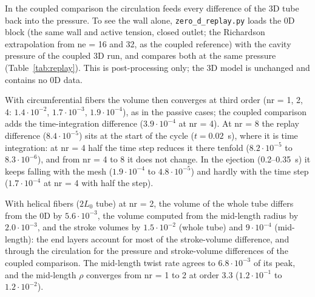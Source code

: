 In the coupled comparison the circulation feeds every difference of the 3D tube back into
the pressure. To see the wall alone, \texttt{zero\_d\_replay.py} loads the 0D block (the
same wall and active tension, closed outlet; the Richardson extrapolation from ne = 16
and 32, as the coupled reference) with the cavity pressure of the
coupled 3D run, and compares both at the same pressure (Table~\ref{tab:replay}). This is
post-processing only; the 3D model is unchanged and contains no 0D data.

With circumferential fibers the volume then converges at third order (nr = 1, 2, 4:
$1.4\cdot10^{-2}$, $1.7\cdot10^{-3}$, $1.9\cdot10^{-4}$), as in the passive cases; the
coupled comparison adds the time-integration difference ($3.9\cdot10^{-4}$ at nr = 4). At
nr = 8 the replay difference ($8.4\cdot10^{-5}$) sits at the start of the cycle
($t = 0.02$~s), where it is time integration: at nr = 4 half the time step reduces it there
tenfold ($8.2\cdot10^{-5}$ to $8.3\cdot10^{-6}$), and from nr = 4 to 8 it does not change. In the
ejection (0.2--0.35~s) it keeps falling with the mesh ($1.9\cdot10^{-4}$ to $4.8\cdot10^{-5}$)
and hardly with the time step ($1.7\cdot10^{-4}$ at nr = 4 with half the step).

With helical fibers ($2L_0$ tube) at nr = 2, the volume of the whole tube differs from the
0D by $5.6\cdot10^{-3}$, the volume computed from the mid-length radius by $2.0\cdot10^{-3}$, and
the stroke volumes by $1.5\cdot10^{-2}$ (whole tube) and $9\cdot10^{-4}$ (mid-length): the end
layers account for most of the stroke-volume difference, and through the circulation for
the pressure and stroke-volume differences of the coupled comparison. The mid-length twist
rate agrees to $6.8\cdot10^{-3}$ of its peak, and the mid-length $\rho$ converges from nr = 1
to 2 at order 3.3 ($1.2\cdot10^{-1}$ to $1.2\cdot10^{-2}$).
